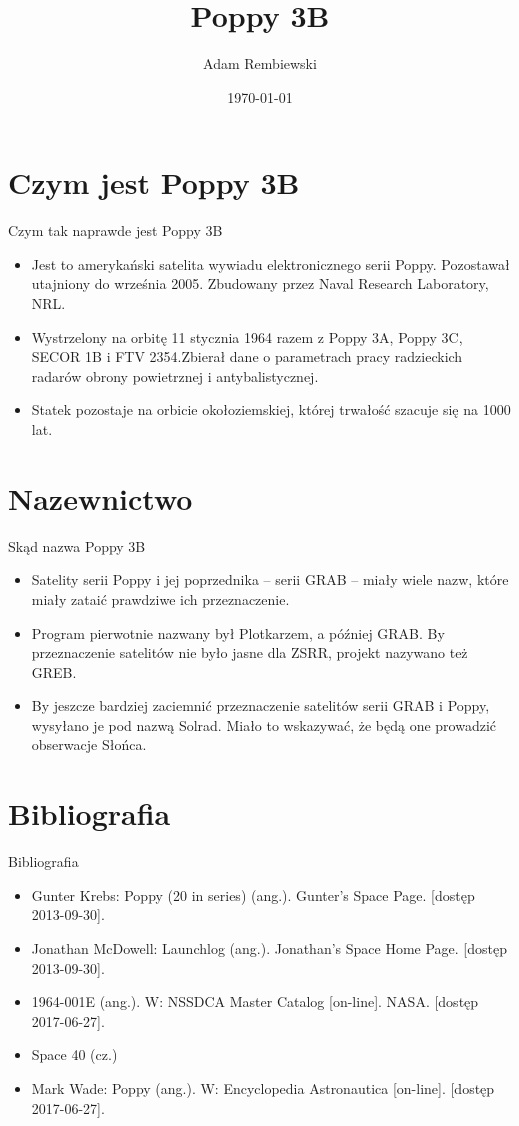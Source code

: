 \documentclass{beamer}
\title{Poppy 3B}
\author{Adam Rembiewski}
\institute{UWM}
\date{\today}
\begin{document}
\frame{\titlepage}



\section{Czym jest Poppy 3B}
\begin{frame}{Czym tak naprawde jest Poppy 3B}
\begin{itemize}
\item{Jest to amerykański satelita wywiadu elektronicznego serii Poppy. Pozostawał utajniony do września 2005. Zbudowany przez Naval Research Laboratory, NRL.}
\pause
\item{Wystrzelony na orbitę 11 stycznia 1964 razem z Poppy 3A, Poppy 3C, SECOR 1B i FTV 2354.Zbierał dane o parametrach pracy radzieckich radarów obrony powietrznej i antybalistycznej.}
\pause
\item{Statek pozostaje na orbicie okołoziemskiej, której trwałość szacuje się na 1000 lat.}
\end{itemize}
\end{frame}

\section{Nazewnictwo}
\begin{frame}{Skąd nazwa Poppy 3B}
\begin{itemize}
\item{Satelity serii Poppy i jej poprzednika – serii GRAB – miały wiele nazw, które miały zataić prawdziwe ich przeznaczenie.}
\pause
\item{Program pierwotnie nazwany był Plotkarzem, a później GRAB. By przeznaczenie satelitów nie było jasne dla ZSRR, projekt nazywano też GREB.}
\pause
\item{By jeszcze bardziej zaciemnić przeznaczenie satelitów serii GRAB i Poppy, wysyłano je pod nazwą Solrad. Miało to wskazywać, że będą one prowadzić obserwacje Słońca.}
\end{itemize}
\end{frame}

\section{Bibliografia}
\begin{frame}{Bibliografia}
\begin{itemize}
\item {Gunter Krebs: Poppy (20 in series) (ang.). Gunter's Space Page. [dostęp 2013-09-30].}
\item {Jonathan McDowell: Launchlog (ang.). Jonathan's Space Home Page. [dostęp 2013-09-30].}
\item {1964-001E (ang.). W: NSSDCA Master Catalog [on-line]. NASA. [dostęp 2017-06-27].}
\item {Space 40 (cz.)}
\item {Mark Wade: Poppy (ang.). W: Encyclopedia Astronautica [on-line]. [dostęp 2017-06-27].}
\end{itemize}
\end{frame}
\end{document}
